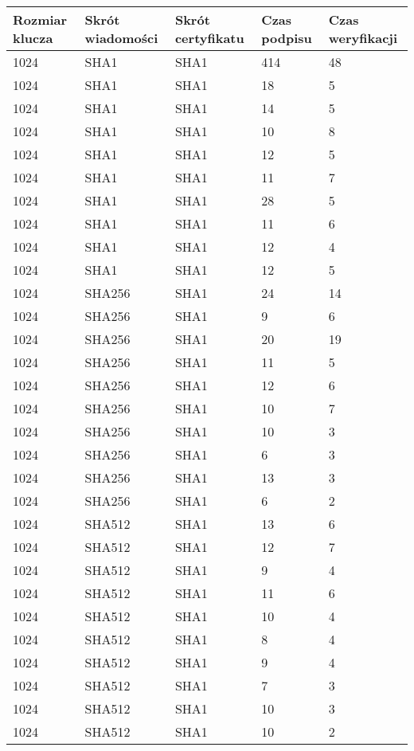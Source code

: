\begin{tabular}{| l | l | l | l | l |}
\hline
Rozmiar klucza & Skrót wiadomości & Skrót certyfikatu & Czas podpisu & Czas weryfikacji \\ \hline 
1024 & SHA1 & SHA1 & 414 & 48 \\ \hline 
1024 & SHA1 & SHA1 & 18 & 5 \\ \hline 
1024 & SHA1 & SHA1 & 14 & 5 \\ \hline 
1024 & SHA1 & SHA1 & 10 & 8 \\ \hline 
1024 & SHA1 & SHA1 & 12 & 5 \\ \hline 
1024 & SHA1 & SHA1 & 11 & 7 \\ \hline 
1024 & SHA1 & SHA1 & 28 & 5 \\ \hline 
1024 & SHA1 & SHA1 & 11 & 6 \\ \hline 
1024 & SHA1 & SHA1 & 12 & 4 \\ \hline 
1024 & SHA1 & SHA1 & 12 & 5 \\ \hline 
1024 & SHA256 & SHA1 & 24 & 14 \\ \hline 
1024 & SHA256 & SHA1 & 9 & 6 \\ \hline 
1024 & SHA256 & SHA1 & 20 & 19 \\ \hline 
1024 & SHA256 & SHA1 & 11 & 5 \\ \hline 
1024 & SHA256 & SHA1 & 12 & 6 \\ \hline 
1024 & SHA256 & SHA1 & 10 & 7 \\ \hline 
1024 & SHA256 & SHA1 & 10 & 3 \\ \hline 
1024 & SHA256 & SHA1 & 6 & 3 \\ \hline 
1024 & SHA256 & SHA1 & 13 & 3 \\ \hline 
1024 & SHA256 & SHA1 & 6 & 2 \\ \hline 
1024 & SHA512 & SHA1 & 13 & 6 \\ \hline 
1024 & SHA512 & SHA1 & 12 & 7 \\ \hline 
1024 & SHA512 & SHA1 & 9 & 4 \\ \hline 
1024 & SHA512 & SHA1 & 11 & 6 \\ \hline 
1024 & SHA512 & SHA1 & 10 & 4 \\ \hline 
1024 & SHA512 & SHA1 & 8 & 4 \\ \hline 
1024 & SHA512 & SHA1 & 9 & 4 \\ \hline 
1024 & SHA512 & SHA1 & 7 & 3 \\ \hline 
1024 & SHA512 & SHA1 & 10 & 3 \\ \hline 
1024 & SHA512 & SHA1 & 10 & 2 \\ \hline 

\end{tabular}
